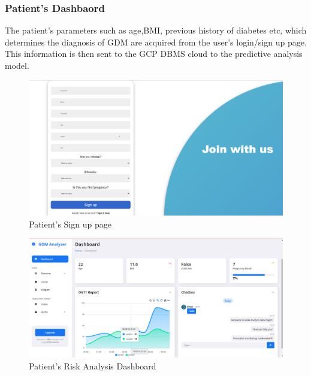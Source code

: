 \documentclass[conference,compsoc]{IEEEtran}
\begin{document}
\subsubsection{Patient's Dashbaord}
The patient's parameters such as age,BMI, previous history of diabetes etc, which determines the diagnosis of GDM are acquired from the user's login/sign up page. This information is then sent to the GCP DBMS cloud to the predictive analysis model.
\begin{figure}[!htbp]
  \centering
  \includegraphics[width=0.8\columnwidth]{signup.png} %
  \caption{Patient's Sign up page }
  \label{fig:glucometer_diag}
\end{figure}
\begin{figure}[!htbp]
  \centering
  \includegraphics[width=0.8\columnwidth]{dash.png} %
  \caption{Patient's Risk Analysis Dashboard }
  \label{fig:glucometer_diag}
\end{figure}
\end{document}
